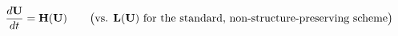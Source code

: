 \documentclass[preview]{standalone}
\begin{document}
\begin{align*}
\special{dvisvgm:raw <g id='unique000'>}\frac{d\mathbf{U}}{dt} = \mathbf{H}(\mathbf{U})\qquad\big(\text{vs. } \mathbf{L}(\mathbf{U}) \text{ for the standard, non-structure-preserving scheme}\big)\special{dvisvgm:raw </g>}
\end{align*}
\end{document}
